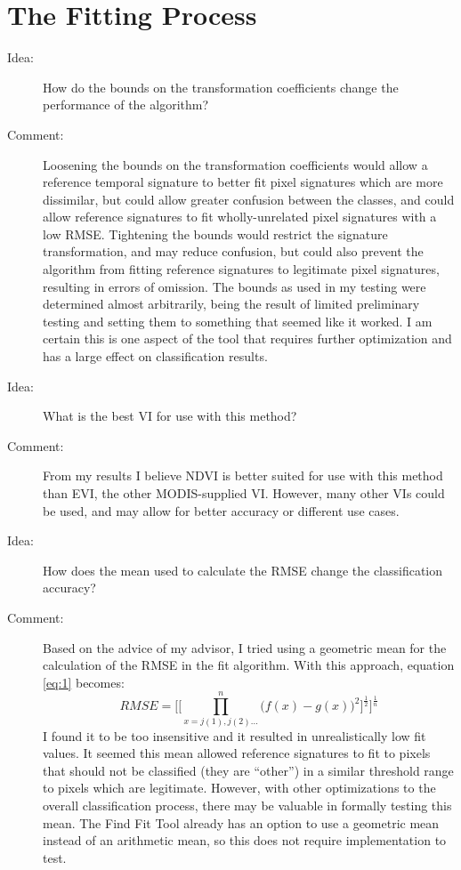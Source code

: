 \section{The Fitting Process}
\label{appendix:future:fitting}

\begin{description}
\item[Idea:] How do the bounds on the transformation coefficients change the performance of the algorithm?

\item[Comment:] Loosening the bounds on the transformation coefficients would allow a reference temporal signature to better fit pixel signatures which are more dissimilar, but could allow greater confusion between the classes, and could allow reference signatures to fit wholly-unrelated pixel signatures with a low RMSE. Tightening the bounds would restrict the signature transformation, and may reduce confusion, but could also prevent the algorithm from fitting reference signatures to legitimate pixel signatures, resulting in errors of omission. The bounds as used in my testing were determined  almost arbitrarily, being the result of limited preliminary testing and setting them to something that seemed like it worked. I am certain this is one aspect of the tool that requires further optimization and has a large effect on classification results.

\item[Idea:] What is the best VI for use with this method?

\item[Comment:] From my results I believe NDVI is better suited for use with this method than EVI, the other MODIS-supplied VI. However, many other VIs could be used, and may allow for better accuracy or different use cases.

\item[Idea:] How does the mean used to calculate the RMSE change the classification accuracy?

\item[Comment:] Based on the advice of my advisor, I tried using a geometric mean for the calculation of the RMSE in the fit algorithm. With this approach, equation \ref{eq:1} becomes:
\begin{equation}
\label{eq:geometricmean}
  RMSE = \Biggl[\biggl[\prod_{x=j(1), j(2)...}^{n}\bigl(f\left(x\right)-g\left(x\right)\bigr)^{2}\biggr]^{\frac{1}{2}}\Biggr]^{\frac{1}{n}}
\end{equation}
I found it to be too insensitive and it resulted in unrealistically low fit values. It seemed this mean allowed reference signatures to fit to pixels that should not be classified (they are “other”) in a similar threshold range to pixels which are legitimate. However, with other optimizations to the overall classification process, there may be valuable in formally testing this mean. The Find Fit Tool already has an option to use a geometric mean instead of an arithmetic mean, so this does not require implementation to test.


\end{description}
